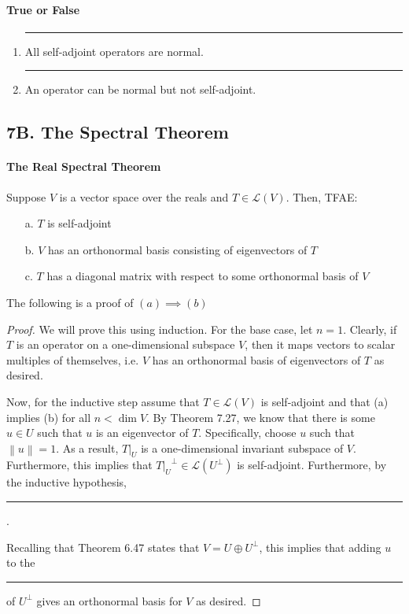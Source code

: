 \documentclass{article}
\newcommand{\norm}[1]{\left\lVert#1\right\rVert}
\newcommand{\blank}[1]{\rule[0ex]{#1in}{0.5pt}}
\begin{document}
\paragraph{True or False}
\begin{enumerate}
    \item \blank{0.5} All self-adjoint operators are normal.
    \item \blank{0.5} An operator can be normal but not self-adjoint.
\end{enumerate}

\subsection*{7B. The Spectral Theorem}
\paragraph{The Real Spectral Theorem}
Suppose $V$ is a vector space over the reals and $T \in \mathcal{L}(V)$. Then, TFAE:
\begin{enumerate}
    \item[a.] $T$ is self-adjoint
    \item[b.] $V$ has an orthonormal basis consisting of eigenvectors of $T$
    \item[c.] $T$ has a diagonal matrix with respect to some orthonormal basis of $V$
\end{enumerate}

The following is a proof of $(a) \implies (b)$
\begin{proof}
We will prove this using induction. For the base case, let $n = 1$. Clearly, if $T$ is an operator on a one-dimensional subspace $V$, then it maps vectors to scalar multiples of themselves, i.e. $V$ has an orthonormal basis of eigenvectors of $T$ as desired.

\bigskip

Now, for the inductive step assume that $T \in \mathcal{L}(V)$ is self-adjoint and that (a) implies (b) for all $n < \dim{V}$. By Theorem 7.27, we know that there is some $u \in U$ such that $u$ is an eigenvector of $T$. Specifically, choose $u$ such that $\norm{u} = 1$. As a result, $T|_U$ is a one-dimensional invariant subspace of $V$. Furthermore, this implies that ${T|_U}^\perp \in \mathcal{L}(U^\perp)$ is self-adjoint. Furthermore, by the inductive hypothesis, 

\blank{5}.

Recalling that Theorem 6.47 states that $V = U \oplus U^\perp$, this implies that adding $u$ to the

\blank{2}
of $U^\perp$ gives an orthonormal basis for $V$ as desired.
\end{proof}
\end{document}
